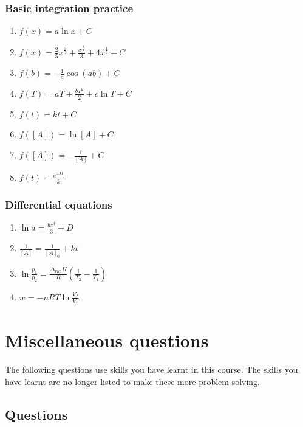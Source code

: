 \documentclass[
]{book}
\providecommand{\tightlist}{%
  \setlength{\itemsep}{0pt}\setlength{\parskip}{0pt}}
\begin{document}
\hypertarget{basic-integration-practice-1}{%
\subsection{Basic integration practice}\label{basic-integration-practice-1}}

\begin{enumerate}
\def\labelenumi{\arabic{enumi}.}
\tightlist
\item
  \(f (x) = a \ln x + C\)
\item
  \(f(x) = \frac{2}{5} x^{\frac{5}{2}}+ \frac{x^{\frac{3}{2}}}{3}+4x^{\frac{1}{2}}+C\)
\item
  \(f(b) =-\frac{1}{a}\cos (ab) + C\)
\item
  \(f(T) = aT + \frac{bT^2}{2} + c\ln T + C\)
\item
  \(f(t) = kt +C\)
\item
  \(f([A])= \ln [A] + C\)
\item
  \(f([A])=-\frac{1}{[A]}+ C\)
\item
  \(f(t) = \frac{e^{-kt}}{k}\)
\end{enumerate}

\hypertarget{differential-equations-1}{%
\subsection{Differential equations}\label{differential-equations-1}}

\begin{enumerate}
\def\labelenumi{\arabic{enumi}.}
\tightlist
\item
  \(\ln a = \frac{bz^3}{3}+D\)
\item
  \(\frac{1}{[A]}=\frac{1}{[A]_0}+ kt\)
\item
  \(\ln \frac{p_1}{p_2}=\frac{\Delta_{\textrm{vap}}H}{R}\left({\frac{1}{T_2}-\frac{1}{T_1}}\right)\)
\item
  \(w = -nRT \ln \frac{V_f}{V_i}\)
\end{enumerate}

\hypertarget{ch:questions}{%
\chapter{Miscellaneous questions}\label{ch:questions}}

The following questions use skills you have learnt in this course. The skills you have learnt are no longer listed to make these more problem solving.

\hypertarget{questions}{%
\section{Questions}\label{questions}}
\end{document}
